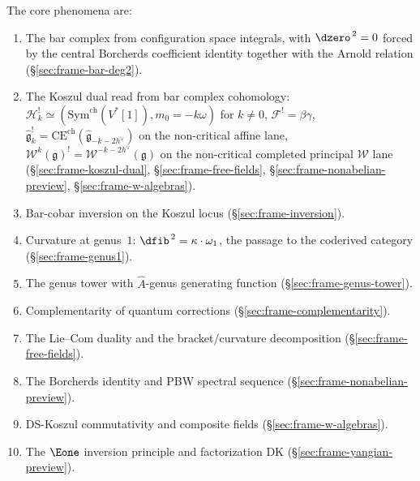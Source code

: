 The core phenomena are:
\begin{enumerate}
\item The bar complex from configuration space integrals,
 with $\dzero^{\,2} = 0$ forced by the central Borcherds
 coefficient identity together with the Arnold relation
 (\S\ref{sec:frame-bar-deg2}).

\item The Koszul dual read from bar complex cohomology:
 $\mathcal{H}_k^!
 \simeq(\mathrm{Sym}^{\mathrm{ch}}(V^*[1]),m_0=-k\omega)$
 for \(k\ne0\),
 $\mathcal{F}^! = \beta\gamma$,
 $\widehat{\mathfrak{g}}_k^!
 = \mathrm{CE}^{\mathrm{ch}}(\widehat{\mathfrak{g}}_{-k-2h^\vee})$
 on the non-critical affine lane,
 $\mathcal{W}^k(\mathfrak{g})^! = \mathcal{W}^{-k-2h^\vee}(\mathfrak{g})$
 on the non-critical completed principal $\mathcal{W}$ lane
 (\S\ref{sec:frame-koszul-dual},
 \S\ref{sec:frame-free-fields},
 \S\ref{sec:frame-nonabelian-preview},
 \S\ref{sec:frame-w-algebras}).

\item Bar-cobar inversion on the Koszul locus
 (\S\ref{sec:frame-inversion}).

\item Curvature at genus~$1$: $\dfib^{\,2} = \kappa \cdot \omega_1$,
 the passage to the coderived category
 (\S\ref{sec:frame-genus1}).

\item The genus tower with $\hat{A}$-genus generating function
 (\S\ref{sec:frame-genus-tower}).

\item Complementarity of quantum corrections
 (\S\ref{sec:frame-complementarity}).

\item The Lie--Com duality and the bracket/curvature decomposition
 (\S\ref{sec:frame-free-fields}).

\item The Borcherds identity and PBW spectral sequence
 (\S\ref{sec:frame-nonabelian-preview}).

\item DS-Koszul commutativity and composite fields
 (\S\ref{sec:frame-w-algebras}).

\item The $\Eone$ inversion principle and factorization DK
 (\S\ref{sec:frame-yangian-preview}).
\end{enumerate}

